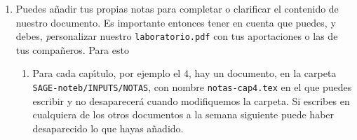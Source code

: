 \begin{appendices}
\begin{enumerate}
\begin{comment}
\end{enumerate}
\item El programa {\itshape Visor de documentos} ({\tt evince}), como otros programas para leer PDFs, tiene varias funciones muy \'utiles:
\begin{enumerate}
	\item {\sc B\'usqueda:} permite buscar dentro del documento una palabra o grupo de palabras. Se muestra como el icono de una {\itshape lupa}.
	\begin{comment}
	\item {\sc Anotaci\'on:} es posible a\~nadir notas (parecidas a {\itshape Postit}s) al documento. Esta no es la manera correcta de personalizar el documento, la forma correcta se explica en el siguiente apartado,  que est\'a en vuestra cuenta del Laboratorio ya que cuando los profesores lo cambiemos por una versi\'on m\'as reciente se pierden las notas. Sin embargo, sirve para personalizar una copia del documento que resida en vuestro ordenador personal. 
	
	Aparece como un icono con una {\itshape hoja de papel y un l\'apiz encima.} 

	\item {\sc Recuperar la p\'agina anterior:} despu\'es de usar un enlace a otra zona del mismo documento se puede volver a la p\'agina en la
	que est\'abamos usando el bot\'on {\itshape Back} (la flecha hacia la izquierda) en {\tt evince}.
\end{enumerate}

\end{comment}



\item Puedes a\~nadir tus propias notas para completar o clarificar el contenido
de nuestro documento. Es importante entonces tener en cuenta
que puedes, y debes,  {\emph personalizar} nuestro \verb|laboratorio.pdf| con
tus
aportaciones o las de tus compa\~neros.  Para esto


\begin{enumerate}
 \item Para cada cap\'{\i}tulo, por ejemplo el $4$,  hay un documento, en la
carpeta \verb|SAGE-noteb/INPUTS/NOTAS|, con nombre \verb|notas-cap4.tex| en el
que puedes escribir y no desaparecer\'a cuando modifiquemos la carpeta. Si
escribes en cualquiera
de los otros documentos a la semana siguiente puede haber desaparecido  lo que
hayas
a\~nadido.


\end{enumerate}
\end{enumerate}
\end{appendices}
